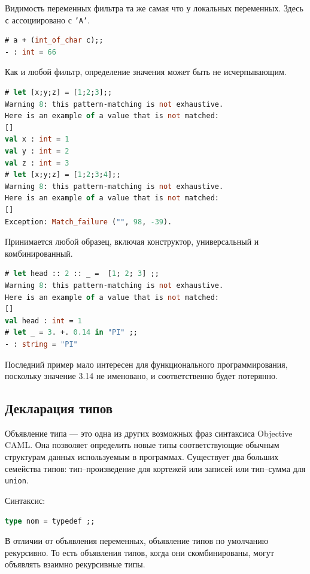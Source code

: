 Видимость переменных фильтра та же самая что у локальных переменных. Здесь
\texttt{c} ассоциировано с \texttt{'A'}.

\begin{lstlisting}[language=OCaml]
# a + (int_of_char c);;
- : int = 66
\end{lstlisting}

Как и любой фильтр, определение значения может быть не исчерпывающим.

\begin{lstlisting}[language=OCaml]
# let [x;y;z] = [1;2;3];;
Warning 8: this pattern-matching is not exhaustive.
Here is an example of a value that is not matched:
[]
val x : int = 1
val y : int = 2
val z : int = 3
# let [x;y;z] = [1;2;3;4];;
Warning 8: this pattern-matching is not exhaustive.
Here is an example of a value that is not matched:
[]
Exception: Match_failure ("", 98, -39).
\end{lstlisting}

Принимается любой образец, включая конструктор, универсальный и комбинированный.

\begin{lstlisting}[language=OCaml]
# let head :: 2 :: _ =  [1; 2; 3] ;;
Warning 8: this pattern-matching is not exhaustive.
Here is an example of a value that is not matched:
[]
val head : int = 1
# let _ = 3. +. 0.14 in "PI" ;;
- : string = "PI"
\end{lstlisting}

Последний пример мало интересен для функционального программирования, поскольку
значение 3.14 не именовано, и соответственно будет потерянно.

\subsection{Декларация типов}

Объявление типа --- это одна из других возможных фраз синтаксиса Objective CAML.
Она позволяет определить новые типы соответствующие обычным структурам данных
используемым в программах. Существует два больших семейства типов:
тип--произведение для кортежей или записей или тип--сумма для \texttt{union}.

Синтаксис:

\begin{lstlisting}[language=OCaml]
type nom = typedef ;;
\end{lstlisting}

В отличии от объявления переменных, объявление типов по умолчанию рекурсивно. То
есть объявления типов, когда они скомбинированы, могут объявлять взаимно
рекурсивные типы.

